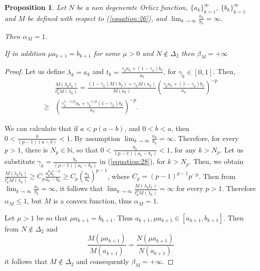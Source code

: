 \documentclass[12pt]{article}
\theoremstyle{thmstyleone}%
\newtheorem{proposition}[theorem]{Proposition}%
\theoremstyle{thmstyletwo}%
\theoremstyle{thmstylethree}%
\begin{document}
{\begin{proposition}\label{proposition:23}
	Let $N$ be a non degenerate Orlicz function, $\{a_k\}_{k=1}^\infty$, $\{b_k\}_{k=1}^\infty$ and $M$ be defined with respect to (\ref{equation:26}), and $\displaystyle \lim_{k\to \infty}\frac{a_k}{b_k}=\infty$.
	
	Then $\alpha_{M}=1$. 
	
	If in addition $\mu a_{k+1}=b_{k+1}$ for some $\mu>0$ and $N\not\in\Delta_2$ then $\beta_M=+\infty$
\end{proposition}
\begin{proof}
	Let us define $\lambda_k=a_k$ and $\displaystyle t_k=\frac{\gamma_k a_k +(1-\gamma_k)b_k}{a_k}$, for $\gamma_k\in[0,1]$. Then, 
	\begin{equation}\label{equation:28}
		\begin{array}{ll}
			&\displaystyle \frac{M(\lambda_k t_k)}{t_k^p M(\lambda_k)}=\frac{(1-\gamma_k)M(b_k)+\gamma_k M(a_k)}{M(a_k)}\left(\frac{\gamma_k a_k +(1-\gamma_k)b_k}{a_k}\right)^{-p}\\
			\geq &\displaystyle \left(\frac{\gamma^{1-1/p}_k a_k +\gamma^{-1/p}_k(1-\gamma_k)b_k}{a_k}\right)^{-p}.
		\end{array}
	\end{equation}
	
	We can calculate that if $a<p (a-b)$, and $0<b<a$, then $\displaystyle 0< \frac{b}{(p-1)(a-b)}<1$. By assumption $\displaystyle \lim_{k\to \infty}\frac{a_k}{b_k}=\infty$. Therefore, for every $p>1$, there is $N_p\in \mathbb{N}$, so that $\displaystyle 0< \frac{b_k}{(p-1)(a_k-b_k)}<1$, for any $k>N_p$. Let us substitute $\displaystyle \gamma_k=\frac{b_k}{(p-1)(a_k-b_k)}$ in (\ref{equation:28}), for $k>N_p$. Then, we obtain $\displaystyle \frac{M(\lambda_k t_k)}{t_k^p M(\lambda_k)}\geq C_p\frac{a_k^p b_k^{1-p}}{a_k-b_k}\geq C_p \left(\frac{a_k }{b_k}\right)^{p-1}$, where $C_p= (p-1)^{p-1}p^{-p}$. Then from  $\displaystyle \lim_{k\to \infty}\frac{a_k}{b_k}=\infty$, it follows that $\displaystyle \lim_{k\to \infty}\frac{M(\lambda_k t_k)}{t_k^p M(\lambda_k)}=\infty$ for every $p>1$. Therefore $\alpha_{M}\leq1$, but $M$ is a convex function, thus $\alpha_{M}=1$.
	
	Let $\mu>1$ be so that $\mu a_{k+1}=b_{k+1}$. Thus $a_{k+1},\mu a_{k+1}\in [a_{k+1},b_{k+1}]$. Then from $N\not\in\Delta_2$ and
	$$
	\frac{M(\mu a_{k+1})}{M(a_{k+1})}=\frac{N(\mu a_{k+1})}{N(a_{k+1})}
	$$
	it follows that $M\not\in\Delta_2$ and consequently $\beta_M=+\infty$.
	
\end{proof}

}
\end{document}
